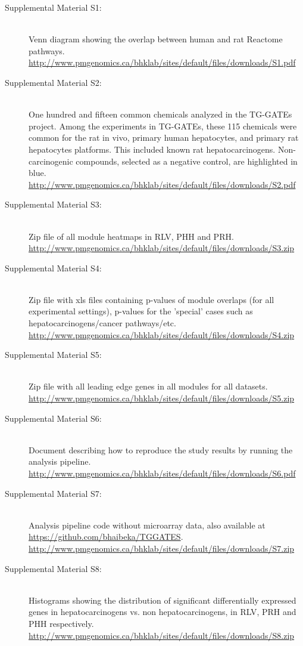 \documentclass[a4paper,12pt]{scrartcl}
\begin{document}
\begin{description}
 \item[Supplemental Material S1:] \hfill \\ Venn diagram showing the overlap between human and rat Reactome pathways. \\ \textcolor{blue}{\url{http://www.pmgenomics.ca/bhklab/sites/default/files/downloads/S1.pdf}} 
 \item[Supplemental Material S2:] \hfill \\ One hundred and fifteen common chemicals analyzed in the TG-GATEs project. Among the experiments in TG-GATEs, these 115 chemicals were common for the rat in vivo, primary human hepatocytes, and primary rat hepatocytes platforms. This included known rat hepatocarcinogens. Non-carcinogenic compounds, selected as a negative control, are highlighted in blue. \\ \textcolor{blue}{\url{http://www.pmgenomics.ca/bhklab/sites/default/files/downloads/S2.pdf}}
 \item[Supplemental Material S3:] \hfill \\ Zip file of all module heatmaps in RLV, PHH and PRH. \\ \textcolor{blue}{\url{http://www.pmgenomics.ca/bhklab/sites/default/files/downloads/S3.zip}}
 \item[Supplemental Material S4:] \hfill \\ Zip file with xls files containing p-values of module overlaps (for all experimental settings), p-values for the 'special' cases such as hepatocarcinogens/cancer pathways/etc. \\ \textcolor{blue}{\url{http://www.pmgenomics.ca/bhklab/sites/default/files/downloads/S4.zip}}
 \item[Supplemental Material S5:] \hfill \\ Zip file with all leading edge genes in all modules for all datasets. \\ \textcolor{blue}{\url{http://www.pmgenomics.ca/bhklab/sites/default/files/downloads/S5.zip}}
 \item[Supplemental Material S6:] \hfill \\ Document describing how to reproduce the study results by running the analysis pipeline. \\ \textcolor{blue}{\url{http://www.pmgenomics.ca/bhklab/sites/default/files/downloads/S6.pdf}}
 \item[Supplemental Material S7:] \hfill \\ Analysis pipeline code without microarray data, also available at \url{https://github.com/bhaibeka/TGGATES}. \\ \textcolor{blue}{\url{http://www.pmgenomics.ca/bhklab/sites/default/files/downloads/S7.zip}}
 \item[Supplemental Material S8:] \hfill \\ Histograms showing the distribution of significant differentially expressed genes in hepatocarcinogens vs. non hepatocarcinogens, in RLV, PRH and PHH respectively. \\ \textcolor{blue}{\url{http://www.pmgenomics.ca/bhklab/sites/default/files/downloads/S8.zip}}
\end{description}
% 
\end{document}
